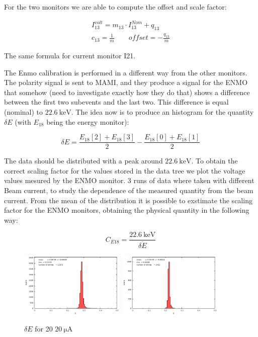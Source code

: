 For the two monitors we are able to compute the offset and scale factor:

\begin{equation}
\begin{split}
I^{volt}_{13} = m_{13} \cdot I^{Nom}_{13} + q_{13}\\
c_{13} = \frac{1}{m} \qquad offset = -\frac{q_{13}}{m}
\end{split}
\end{equation}

The same formula for current monitor I21.

The Enmo calibration is performed in a different way from the other monitors. The polarity signal is sent to MAMI, and they produce a signal for the ENMO that somehow (need to investigate exactly how they do that) shows a difference between the first two subevents and the last two. This difference is equal (nominal) to $\SI{22.6}{\kilo \electronvolt}$. The idea now is to produce an histogram for the quantity $\delta E$ (with $E_{18}$ being the energy monitor):

\begin{equation*}
\delta E = \frac{E_{18}[2] + E_{18}[3]}{2} - \frac{E_{18}[0] + E_{18}[1]}{2} 
\end{equation*}

The data should be distributed with a peak around $\SI{22.6}{\kilo \electronvolt}$. To obtain the correct scaling factor for the values stored in the data tree we plot the voltage values mesured by the ENMO monitor.
3 runs of data where taken with different Beam current, to study the dependence of the measured quantity from the beam current. From the mean of the distribution it is possible to exstimate the scaling factor for the ENMO monitors, obtaining the physical quantity in the following way:

\begin{equation*}
C_{E18} = \frac{\SI{22.6}{\kilo \electronvolt}}{\overline{\delta E}}
\end{equation*}

\begin{figure}[hbtp]
\centering
\includegraphics[width = 0.45\textwidth]{Analysis/ENMOvoltage20.pdf}
\includegraphics[width = 0.45\textwidth]{Analysis/ENMOvoltage15.pdf} 
\caption{$\delta E$ for 20 $\SI{20}{\micro \ampere}$}
\end{figure}

